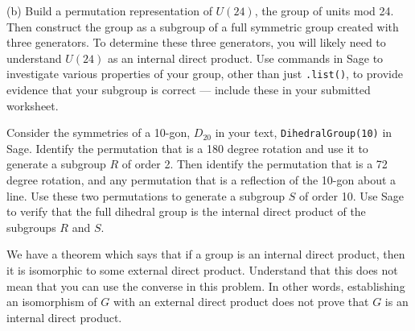 %
(b) Build a permutation representation of $U(24)$, the group of units mod 24.  Then construct the group as a subgroup of a full symmetric group created with three generators.  To determine these three generators, you will likely need to understand $U(24)$ as an internal direct product.  Use commands in Sage to investigate various properties of your group, other than just \verb?.list()?, to provide evidence that your subgroup is correct --- include these in your submitted worksheet.
\begin{sageverbatim}\end{sageverbatim}
%
%
Consider the symmetries of a 10-gon, $D_{20}$ in your text, \verb?DihedralGroup(10)? in Sage.  Identify the permutation that is a 180 degree rotation and use it to generate a subgroup $R$ of order 2.  Then identify the permutation that is a 72 degree rotation, and any permutation that is a reflection of the 10-gon about a line.  Use these two permutations to generate a subgroup $S$ of order 10.  Use Sage to verify that the full dihedral group is the internal direct product of the subgroups $R$ and $S$.\par
%
We have a theorem which says that if a group is an internal direct product, then it is isomorphic to some external direct product.  Understand that this does not mean that you can use the converse in this problem.  In other words, establishing an isomorphism of $G$ with an external direct product does not prove that $G$ is an internal direct product.
\begin{sageverbatim}\end{sageverbatim}
%
